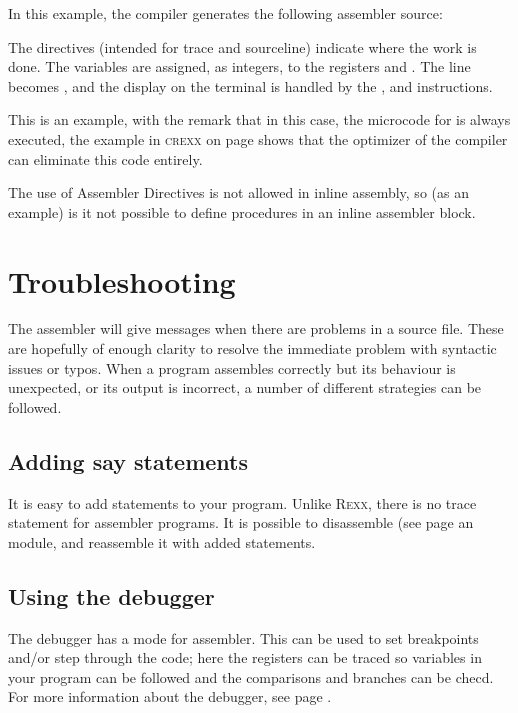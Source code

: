 In this example, the compiler generates the following assembler source:


The  directives (intended for trace and sourceline) indicate where the work is done. The
variables are assigned, as integers, to the registers  and
. The line  becomes , and the display on the terminal is handled by the
, and  instructions.

This is an example, with the remark that in this case, the microcode
for  is always executed, the example in \textsc{crexx} on
page \pageref{fpowexample} shows that the \crexx{} optimizer of the
compiler can eliminate this code entirely.

The use of Assembler Directives is not allowed in inline assembly, so
(as an example) is it not possible to define procedures in an inline
assembler block.

\section{Troubleshooting}
The assembler will give messages when there are problems in a source
file. These are hopefully of enough clarity to resolve the immediate
problem with syntactic issues or typos. When a program assembles
correctly but its behaviour is unexpected, or its output is incorrect,
a number of different strategies can be followed.

\subsection{Adding say statements}
It is easy to add  statements to your program. Unlike
\textsc{Rexx}, there is no trace statement for assembler programs. It
is possible to disassemble (see page \pageref{disassembler} an  module, and reassemble it
with added statements.

\subsection{Using the debugger}
The  debugger has a mode for assembler. This can be used to
set breakpoints and/or step through the code; here the registers can
be traced so variables in your program can be followed and the
comparisons and branches can be checd. For more information about the
debugger, see page \pageref{debugger}.


